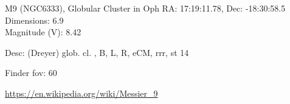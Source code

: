 \begin{block}{M9 (NGC6333), Globular Cluster in Oph}
    RA: 17:19:11.78, Dec: -18:30:58.5 \\ 
    Dimensions: 6.9 \\ 
    Magnitude (V): 8.42


    Desc: (Dreyer) glob. cl. , B, L, R, eCM, rrr, st 14 

    Finder fov: 60 

    \url{https://en.wikipedia.org/wiki/Messier_9} 
\end{block}